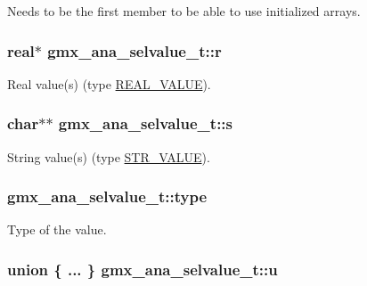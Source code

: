 \-Needs to be the first member to be able to use initialized arrays. \hypertarget{structgmx__ana__selvalue__t_afdab2e1a8e6d0b4157f0d823f063020a}{
\subsubsection[{r}]{\setlength{\rightskip}{0pt plus 5cm}real$\ast$ {\bf gmx\-\_\-ana\-\_\-selvalue\-\_\-t\-::r}}}\label{structgmx__ana__selvalue__t_afdab2e1a8e6d0b4157f0d823f063020a}
\-Real value(s) (type \hyperlink{share_2template_2gromacs_2selvalue_8h_a70b42b87d434580bf1493591857b8beca7aa9587044cd6fd9c1f1690719a072cf}{\-R\-E\-A\-L\-\_\-\-V\-A\-L\-U\-E}). \hypertarget{structgmx__ana__selvalue__t_aa4c476a22542ca86519dc9851c08e767}{
\subsubsection[{s}]{\setlength{\rightskip}{0pt plus 5cm}char$\ast$$\ast$ {\bf gmx\-\_\-ana\-\_\-selvalue\-\_\-t\-::s}}}\label{structgmx__ana__selvalue__t_aa4c476a22542ca86519dc9851c08e767}
\-String value(s) (type \hyperlink{share_2template_2gromacs_2selvalue_8h_a70b42b87d434580bf1493591857b8beca6f2f1fe9592d96990c9ac690c355bd08}{\-S\-T\-R\-\_\-\-V\-A\-L\-U\-E}). \hypertarget{structgmx__ana__selvalue__t_a0a7b3be96275660c0fb58068c31d8daf}{
\subsubsection[{type}]{ {\bf gmx\-\_\-ana\-\_\-selvalue\-\_\-t\-::type}}}\label{structgmx__ana__selvalue__t_a0a7b3be96275660c0fb58068c31d8daf}
\-Type of the value. \hypertarget{structgmx__ana__selvalue__t_a47d85dba2471011f88b5fc779dd85a3e}{
\subsubsection[{u}]{\setlength{\rightskip}{0pt plus 5cm}union \{ ... \}                             {\bf gmx\-\_\-ana\-\_\-selvalue\-\_\-t\-::u}}}\label{structgmx__ana__selvalue__t_a47d85dba2471011f88b5fc779dd85a3e}
